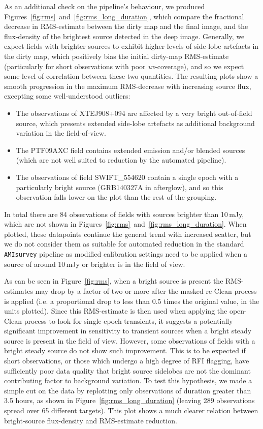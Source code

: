 \documentclass[5p,authoryear]{elsarticle}
\begin{document}
As an additional check on the pipeline's behaviour, we produced Figures~\ref{fig:rms}~and~\ref{fig:rms_long_duration}, which compare the fractional decrease in RMS-estimate between the dirty map and the final image, and the flux-density of the brightest source detected in the deep image. 
Generally, we expect fields with brighter sources to exhibit higher levels of side-lobe artefacts in the dirty map, which positively bias the initial dirty-map RMS-estimate (particularly for short observations with poor \textit{uv}-coverage), and so we expect some level of correlation between these two quantities. 
The resulting plots show a smooth progression in the maximum RMS-decrease with increasing source flux, excepting some well-understood outliers:
\begin{itemize}
   \item The observations of XTEJ908+094 are affected by a very bright out-of-field source, which presents extended side-lobe artefacts as additional background variation in the field-of-view.
   \item The PTF09AXC field contains extended emission and/or blended sources (which are not well suited to reduction by the automated pipeline).
   \item The observations of field SWIFT\_554620 contain a single epoch with a particularly bright source (GRB140327A in afterglow), and so this observation falls lower on the  plot than the rest of the grouping.
\end{itemize}
In total there are 84 observations of fields with sources brighter than 10\,mJy, which are not shown in Figures~\ref{fig:rms}~and~\ref{fig:rms_long_duration}.
When plotted, these datapoints continue the general trend with increased scatter, but we do not consider them as suitable for automated reduction in the standard \texttt{AMIsurvey} pipeline as modified calibration settings need to be applied when a source of around 10\,mJy or brighter is in the field of view.

As can be seen in Figure~\ref{fig:rms}, when a bright source is present the RMS-estimates may drop by a factor of two or more after the masked re-Clean process is applied (i.e. a proportional drop to less than 0.5 times the original value, in the units plotted). 
Since this RMS-estimate is then used when applying the open-Clean process to look for single-epoch transients, it suggests a potentially significant improvement in sensitivity to transient sources when a bright steady source is present in the field of view. However, some observations of fields with a bright steady source do not show such improvement. This is to be expected if short observations, or those which undergo a high degree of RFI flagging, have sufficiently poor data quality that bright source sidelobes are not the dominant contributing factor to background variation. To test this hypothesis, we made a simple cut on the data by replotting only observations of duration greater than 3.5 hours, as shown in Figure~\ref{fig:rms_long_duration} (leaving 289 observations spread over 65 different targets). This plot shows a much clearer relation between bright-source flux-density and RMS-estimate reduction.
\end{document}
